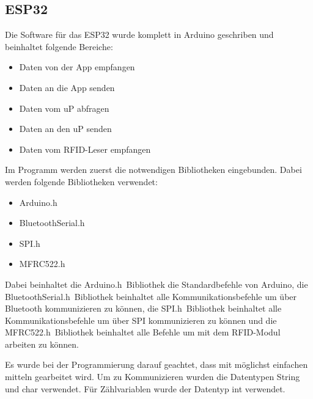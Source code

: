\subsection{ESP32}
\label{subsec:Software_ESP32}

Die Software für das ESP32 wurde komplett in Arduino geschriben und beinhaltet folgende Bereiche:

\begin{itemize}
\item Daten von der App empfangen
\item Daten an die App senden
\item Daten vom uP abfragen
\item Daten an den uP senden 
\item Daten vom RFID-Leser empfangen
\end{itemize}

Im Programm werden zuerst die notwendigen Bibliotheken  eingebunden. Dabei werden folgende Bibliotheken verwendet:

\begin{itemize}
\item Arduino.h
\item BluetoothSerial.h
\item SPI.h
\item MFRC522.h
\end{itemize}

Dabei beinhaltet die \flqq Arduino.h\frqq~Bibliothek die Standardbefehle von Arduino, die \flqq BluetoothSerial.h\frqq~Bibliothek beinhaltet alle Kommunikationsbefehle um über Bluetooth kommunizieren zu können, die \flqq SPI.h\frqq~Bibliothek beinhaltet alle Kommunikationsbefehle um über SPI kommunizieren zu können und die \flqq MFRC522.h\frqq~Bibliothek beinhaltet alle Befehle um mit dem RFID-Modul arbeiten zu können.

Es wurde bei der Programmierung darauf geachtet, dass mit möglichst einfachen mitteln gearbeitet wird. Um zu Kommunizieren wurden die Datentypen String und char verwendet. Für Zählvariablen wurde der Datentyp int verwendet. 